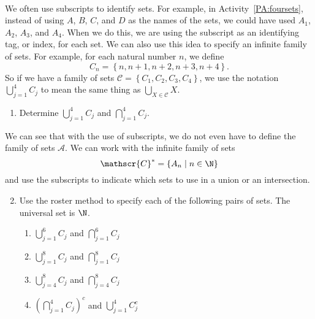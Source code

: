 \begin{previewactivity} \label{PA:indexfamily} \hfill \\
We often use subscripts to identify sets.  For example, in 
\typeu Activity~\ref*{PA:foursets}, instead of using $A$, $B$, $C$, and $D$ as the names of the sets, we could have used $A_1$, $A_2$, $A_3$, and $A_4$.  When we do this, we are using the subscript as an identifying tag, or index, for each set.  We can also use this idea to specify an infinite family of sets.  For example, for each natural number $n$, we define
\[
C_n = \left\{ n, n+1, n+2, n+3, n+4 \right\}\!.
\]
So if we have a family of sets $\mathscr{C} = \left\{ C_1, C_2, C_3, C_4 \right\}$, we use the notation 
$\bigcup\limits_{j=1}^{4}C_j$ to mean the same thing as 
$\bigcup\limits_{X \in \mathscr{C}}^{}X$\!.
\begin{enumerate}
\item Determine $\bigcup\limits_{j=1}^{4}C_j$  and  $\bigcap\limits_{j=1}^{4}C_j$\!.
\end{enumerate}
We can see that with the use of subscripts, we do not even have to define the family of sets 
$\mathscr{A}$.  We can work with the infinite family of sets
\[
\mathscr{C}^* = \left\{ A_n \mid n \in \N \right\}
\]
and use the subscripts to indicate which sets to use in a union or an intersection.

\begin{enumerate} \setcounter{enumi}{1}
\item Use the roster method to specify each of the following pairs of sets.  The universal set is 
$\N$.
\begin{multicols}{2}
\begin{enumerate}
\item $\bigcup\limits_{j=1}^{6}C_j$  and  $\bigcap\limits_{j=1}^{6}C_j$
\item $\bigcup\limits_{j=1}^{8}C_j$  and  $\bigcap\limits_{j=1}^{8}C_j$
\item $\bigcup\limits_{j=4}^{8}C_j$  and  $\bigcap\limits_{j=4}^{8}C_j$
\item $\left( \bigcap\limits_{j=1}^{4}C_j \right)^c$  and  $\bigcup\limits_{j=1}^{4}C_j^c$
\end{enumerate}
\end{multicols}
\end{enumerate}
\end{previewactivity}
\hbreak

\endinput
